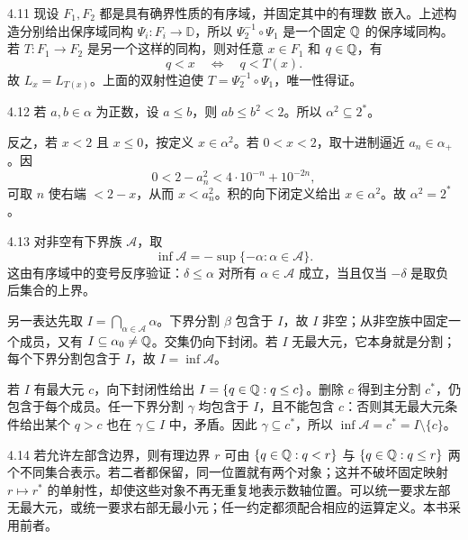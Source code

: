 \begin{solution}{4.11}
现设 \(F_1,F_2\) 都是具有确界性质的有序域，并固定其中的有理数
嵌入。上述构造分别给出保序域同构
\(\Psi_i:F_i\to\mathbb D\)，所以
\(\Psi_2^{-1}\circ\Psi_1\) 是一个固定 \(\mathbb{Q}\) 的保序域同构。
若 \(T:F_1\to F_2\) 是另一个这样的同构，则对任意 \(x\in F_1\)
和 \(q\in\mathbb{Q}\)，有
\[
  q<x\quad\Longleftrightarrow\quad q<T(x).
\]
故 \(L_x=L_{T(x)}\)。上面的双射性迫使
\(T=\Psi_2^{-1}\circ\Psi_1\)，唯一性得证。
\end{solution}

\begin{solution}{4.12}
若 \(a,b\in\alpha\) 为正数，设 \(a\le b\)，则 \(ab\le b^2<2\)。所以 \(\alpha^2\subseteq2^*\)。

反之，若 \(x<2\) 且 \(x\le0\)，按定义 \(x\in\alpha^2\)。若 \(0<x<2\)，取十进制逼近 \(a_n\in\alpha_+\)。因
\[
 0<2-a_n^2<4\cdot10^{-n}+10^{-2n},
\]
可取 \(n\) 使右端 \(<2-x\)，从而 \(x<a_n^2\)。积的向下闭定义给出 \(x\in\alpha^2\)。故 \(\alpha^2=2^*\)。
\end{solution}

\begin{solution}{4.13}
对非空有下界族 \(\mathcal A\)，取
\[
 \inf\mathcal A=-\sup\{-\alpha:\alpha\in\mathcal A\}.
\]
这由有序域中的变号反序验证：\(\delta\le\alpha\) 对所有 \(\alpha\in\mathcal A\) 成立，当且仅当 \(-\delta\) 是取负后集合的上界。

另一表达先取 \(I=\bigcap_{\alpha\in\mathcal A}\alpha\)。下界分割 \(\beta\) 包含于 \(I\)，故 \(I\) 非空；从非空族中固定一个成员，又有 \(I\subseteq\alpha_0\ne\mathbb{Q}\)。交集仍向下封闭。若 \(I\) 无最大元，它本身就是分割；每个下界分割包含于 \(I\)，故 \(I=\inf\mathcal A\)。

若 \(I\) 有最大元 \(c\)，向下封闭性给出 \(I=\{q\in\mathbb{Q}:q\le c\}\)。删除 \(c\) 得到主分割 \(c^*\)，仍包含于每个成员。任一下界分割 \(\gamma\) 均包含于 \(I\)，且不能包含 \(c\)：否则其无最大元条件给出某个 \(q>c\) 也在 \(\gamma\subseteq I\) 中，矛盾。因此 \(\gamma\subseteq c^*\)，所以 \(\inf\mathcal A=c^*=I\setminus\{c\}\)。
\end{solution}

\begin{solution}{4.14}
若允许左部含边界，则有理边界 \(r\) 可由 \(\{q\in\mathbb{Q}:q<r\}\) 与 \(\{q\in\mathbb{Q}:q\le r\}\) 两个不同集合表示。若二者都保留，同一位置就有两个对象；这并不破坏固定映射 \(r\mapsto r^*\) 的单射性，却使这些对象不再无重复地表示数轴位置。可以统一要求左部无最大元，或统一要求右部无最小元；任一约定都须配合相应的运算定义。本书采用前者。
\end{solution}

